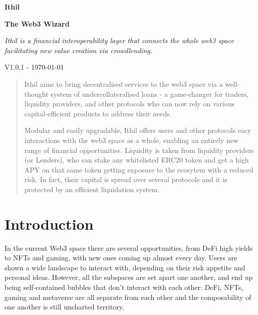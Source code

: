 \documentclass[a4paper,10 pt]{article}
\theoremstyle{definition}
\begin{document}
\begin{titlepage}
    \begin{center}
        \vspace*{1cm}
            
        \Huge
        \textbf{Ithil}

        \vspace{0.5cm}
        \Large
        {\bf The Web3 Wizard}

        \vspace{1cm}
        \Large
        {\it Ithil is a financial interoperability layer that connects the whole web3 space facilitating new value creation via crowdlending.}

        \vspace{1.5cm}
        {\normalsize V1.0.1 - \today}
        \vspace{1.0cm}

        \begin{abstract}        
        Ithil aims to bring decentralised services to the web3 space via a well-thought system of undercollateralised loans - a game-changer for traders, liquidity providers, and other protocols who can now rely on various capital-efficient products to address their needs. 
        
        Modular and easily upgradable, Ithil offers users and other protocols easy interactions with the web3 space as a whole, enabling an entirely new range of financial opportunities. Liquidity is taken from liquidity providers (or Lenders), who can stake any whitelisted ERC20 token and get a high APY on that same token getting exposure to the ecosytem with a reduced risk. In fact, their capital is spread over several protocols and it is protected by an efficient liquidation system.
        \end{abstract}
            
    \end{center}
\tableofcontents
\end{titlepage}

\section{Introduction}

In the current Web3 space there are several opportunities, from DeFi high yields to NFTs and gaming, with new ones coming up almost every day. Users are shown a wide landscape to interact with, depending on their risk appetite and personal ideas. However, all the subspaces are set apart one another, and end up being self-contained bubbles that don't interact with each other: DeFi, NFTs, gaming and metaverse are all separate from each other and the composability of one another is still uncharted territory.
\end{document}
